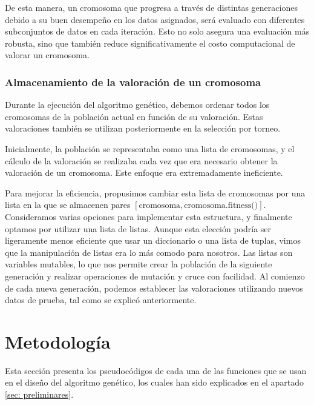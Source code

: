 \documentclass[conference,a4paper]{IEEEtran}
\begin{document}
De esta manera, un cromosoma que progresa a través de distintas generaciones debido a su buen desempeño en los datos asignados, será evaluado con diferentes subconjuntos de datos en cada iteración. Esto no solo asegura una evaluación más robusta, sino que también reduce significativamente el costo computacional de valorar un cromosoma.


\subsubsection{Almacenamiento de la valoración de un cromosoma}
Durante la ejecución del algoritmo genético, debemos ordenar todos los cromosomas de la población actual en función de su valoración. Estas valoraciones también se utilizan posteriormente en la selección por torneo.

Inicialmente, la población se representaba como una lista de cromosomas, y el cálculo de la valoración se realizaba cada vez que era necesario obtener la valoración de un cromosoma. Este enfoque era extremadamente ineficiente.

Para mejorar la eficiencia, propusimos cambiar esta lista de cromosomas por una lista en la que se almacenen pares \([\text{cromosoma}, \text{cromosoma.fitness()}]\). Consideramos varias opciones para implementar esta estructura, y finalmente optamos por utilizar una lista de listas. Aunque esta elección podría ser ligeramente menos eficiente que usar un diccionario o una lista de tuplas, vimos que la manipulación de listas era lo más comodo para nosotros. Las listas son variables mutables, lo que nos permite crear la población de la siguiente generación y realizar operaciones de mutación y cruce con facilidad. Al comienzo de cada nueva generación, podemos establecer las valoraciones utilizando nuevos datos de prueba, tal como se explicó anteriormente.


\section{Metodología}

Esta sección presenta los pseudocódigos de cada una de las funciones que se usan en el diseño del algoritmo genético, los cuales han sido explicados en el apartado \ref{sec: preliminares}.
\end{document}
